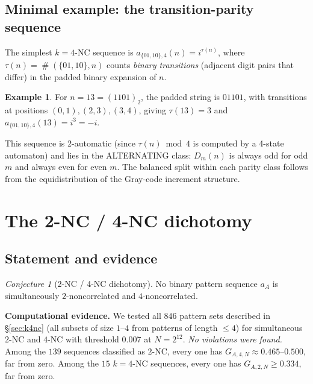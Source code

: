 \documentclass[11pt]{article}
\theoremstyle{definition}
\newtheorem{example}[theorem]{Example}
\theoremstyle{remark}
\newtheorem{conjecture}[theorem]{Conjecture}
\DeclareMathOperator{\occ}{\#}
\begin{document}
\subsection{Minimal example: the transition-parity sequence}

The simplest $k=4$-NC sequence is $a_{\{01,10\},4}(n) = i^{\tau(n)}$,
where $\tau(n) = \occ(\{01,10\}, n)$ counts \emph{binary transitions}
(adjacent digit pairs that differ) in the padded binary expansion of $n$.

\begin{example}
For $n = 13 = (1101)_2$, the padded string is $01101$, with transitions
at positions $(0,1), (2,3), (3,4)$, giving $\tau(13) = 3$ and
$a_{\{01,10\},4}(13) = i^3 = -i$.
\end{example}

This sequence is 2-automatic (since $\tau(n) \bmod 4$ is computed by
a 4-state automaton) and lies in the ALTERNATING class: $D_m(n)$ is
always odd for odd $m$ and always even for even $m$.  The balanced
split within each parity class follows from the equidistribution of
the Gray-code increment structure.

\section{The 2-NC / 4-NC dichotomy}
\label{sec:dichotomy}

\subsection{Statement and evidence}

\begin{conjecture}[2-NC / 4-NC dichotomy]
\label{conj:dichotomy}
No binary pattern sequence $a_A$ is simultaneously $2$-noncorrelated
and $4$-noncorrelated.
\end{conjecture}

\textbf{Computational evidence.}
We tested all $846$ pattern sets described in \S\ref{sec:k4nc} (all
subsets of size $1$--$4$ from patterns of length $\leq 4$) for
simultaneous $2$-NC and $4$-NC with threshold $0.007$ at $N = 2^{12}$.
\emph{No violations were found.}  Among the $139$ sequences classified
as $2$-NC, every one has $G_{A,4,N} \approx 0.465$--$0.500$, far from
zero.  Among the $15$ $k=4$-NC sequences, every one has
$G_{A,2,N} \geq 0.334$, far from zero.
\end{document}
